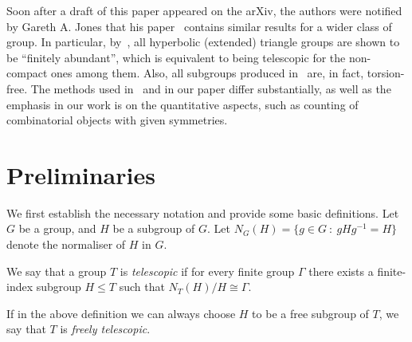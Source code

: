 \documentclass[ALCO,ThmDefs,Unicode,epreuves]{cedram}
\begin{document}

\begin{rema*}
Soon after a draft of this paper appeared on the arXiv, the authors were notified by Gareth A. Jones that his paper~\cite{Jones-arXiv} contains similar results for a wider class of group. In particular, by~\cite[Theorem~3]{Jones-arXiv}, all hyperbolic (extended) triangle groups are shown to be ``finitely abundant'', which is equivalent to being telescopic for the non-compact ones among them. Also, all subgroups produced in~\cite[Theorem~3]{Jones-arXiv} are, in fact, torsion-free. The methods used in~\cite{Jones-arXiv} and in our paper differ substantially, as well as the emphasis in our work is on the quantitative aspects, such as counting of combinatorial objects with given symmetries. 
\end{rema*}

\section{Preliminaries}

We first establish the necessary notation and provide some basic definitions. Let $G$ be a group, and $H$ be a subgroup of $G$. Let $N_G(H) = \{ g \in G\ :\ gHg^{-1} = H \}$ denote the normaliser of $H$ in $G$. 

\begin{defi}\label{defn:telescopic}
We say that a group $T$ is \emph{telescopic} if for every finite group $\Gamma$ there exists a finite-index subgroup $H \leq T$ such that $N_T(H)/H \cong \Gamma$. 
\end{defi}

\begin{defi}
If in the above definition we can always choose $H$ to be a free subgroup of $T$, we say that $T$ is \emph{freely telescopic}. 
\end{defi}
\end{document}
